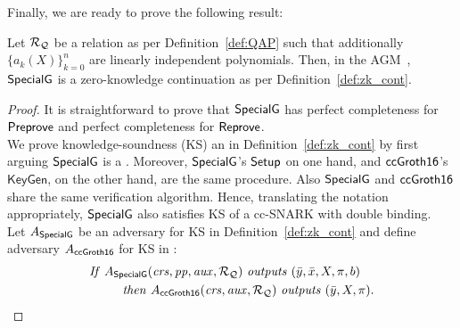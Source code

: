 \noindent Finally, we are ready to prove the following result:

\begin{theorem}
\label{sec_specialg}
Let $\mathcal{R}_{\mathcal{Q}}$ be a relation as per Definition~\ref{def:QAP} such that additionally $\{a_k(X)\}_{k=0}^n$ are linearly independent polynomials. Then, in the 
AGM~\cite{Fuchs_AGM}, ${\mathsf{SpecialG}}$ is a zero-knowledge continuation as per Definition~\ref{def:zk_cont}. 
\end{theorem}
\begin{proof} It is straightforward to prove that ${\mathsf{SpecialG}}$ has perfect completeness for ${\mathsf{Preprove}}$ and perfect completeness 
for ${\mathsf{Reprove}}$. \\

\noindent We prove knowledge-soundness (KS) an in Definition~\ref{def:zk_cont} by first arguing ${\mathsf{SpecialG}}$ is a 
. 
 Moreover, 
${\mathsf{SpecialG}}$'s ${\mathsf{Setup}}$ on one hand, and ${\mathsf{ccGroth16}}$'s $ \mathsf{KeyGen} $, on the other hand, are the same procedure. Also ${\mathsf{SpecialG}}$ 
and ${\mathsf{ccGroth16}}$ share the same verification algorithm. Hence, translating the notation appropriately, ${\mathsf{SpecialG}}$ also satisfies KS 
of a cc-SNARK with double binding. \\

\noindent Let $A_{{\mathsf{SpecialG}}}$ be an adversary for KS in Definition~\ref{def:zk_cont} and 
define adversary $A_{{\mathsf{ccGroth16}}}$ for KS  in :
\begin{align*}
&\mathit{If} \ A_{\SpecialG} (\crs, \pp, \realaux, \relRQ)\ \mathit{outputs} \  (\bary, \barx, X, \pi, b) \\
&\ \ \ \ \ \ \ \ \mathit{then}\ A_{\ccgroth} (\crs, \realaux, \relRQ)\ \mathit{outputs} \ (\bary, X, \pi). 
\end{align*}


\end{proof}
